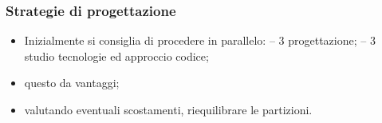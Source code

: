     \subsubsection{Strategie di progettazione}
        \begin{itemize}
            \item Inizialmente si consiglia di procedere in parallelo:
                \subitem -- 3 progettazione;
                \subitem -- 3 studio tecnologie ed approccio codice;
            \item questo da vantaggi;
            \item valutando eventuali scostamenti, riequilibrare le partizioni.
        \end{itemize}








